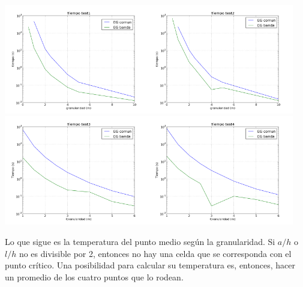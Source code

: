 \documentclass[spanish,a4paper]{article}
\begin{document}
\includegraphics[width=180pt]{tiempo1.png}\includegraphics[width=180pt]{tiempo2.png}
\includegraphics[width=180pt]{tiempo3.png}\includegraphics[width=180pt]{tiempo4.png} 

Lo que sigue es la temperatura del punto medio según la granularidad. Si $a/h$ o $l/h$ no es divisible por 2, entonces no hay una celda que se corresponda con el punto crítico. Una posibilidad para calcular su temperatura es, entonces, hacer un promedio de los cuatro puntos que lo rodean.
\end{document}
